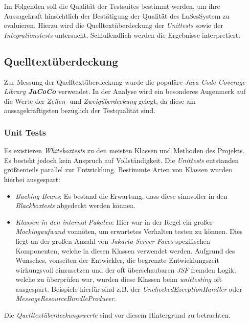 
Im Folgenden soll die Qualität der Testsuites bestimmt werden,
um ihre Aussagekraft hinsichtlich der Bestätigung der Qualität des LaSes\-System zu evaluieren.
Hierzu wird die Quelltextüberdeckung der \emph{Unittests} sowie der \emph{Integrationstests} untersucht.
Schlußendlich werden die Ergebnisse interpretiert.

\subsection{Quelltextüberdeckung}\label{subsec:quelltextueberdeckung}
Zur Messung der Quelltextüberdeckung wurde die populäre \emph{Java Code Coverage Library \textbf{JaCoCo}} verwendet.
In der Analyse wird ein besonderes Augenmerk auf die Werte der \emph{Zeilen-} und \emph{Zweigüberdeckung} gelegt,
da diese am aussagekräftigsten bezüglich der Testqualität sind.

\subsubsection{Unit Tests}
Es existieren \emph{Whiteboxtests} zu den meisten Klassen und Methoden des Projekts.
Es besteht jedoch kein Anspruch auf Vollständigkeit.
Die \emph{Unittests} entstanden größtenteils parallel zur Entwicklung.
Bestimmte Arten von Klassen wurden hierbei ausgespart:

\begin{itemize}
    \item \emph{Backing-Beans}: Es bestand die Erwartung, dass diese sinnvoller in den \emph{Blackboxtests}
    abgedeckt werden können.
    \item \emph{Klassen in den internal-Paketen}: Hier war in der Regel ein großer \emph{Mockingaufwand} vonnöten,
    um erwartetes Verhalten testen zu können.
    Dies liegt an der großen Anzahl von \emph{Jakarta Server Faces} spezifischen Komponenten,
    welche in diesen Klassen verwendet werden.
    Aufgrund des Wunsches, vonseiten der Entwickler, die begrenzte Entwicklungszeit
    wirkungsvoll einzusetzen und der oft überschaubaren \emph{JSF} fremden Logik, welche zu überprüfen war,
    wurden diese Klassen beim \emph{unittesting} oft ausgespart.
    Beispiele hierfür sind z.B. der \emph{UncheckedExceptionHandler} oder \emph{MessageResourceBundleProducer}.
\end{itemize}
Die \emph{Quelltextüberdeckungswerte} sind vor diesem Hintergrund zu betrachten.

